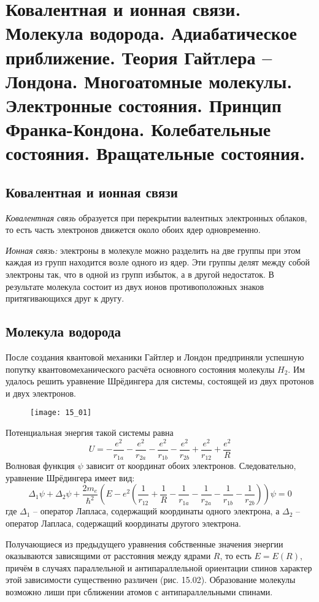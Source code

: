 \chapter{Ковалентная и ионная связи. Молекула водорода. Адиабатическое 
приближение. Теория Гайтлера -- Лондона. Многоатомные молекулы. 
Электронные состояния. Принцип Франка-Кондона. Колебательные состояния. 
Вращательные состояния.}

\section{Ковалентная и ионная связи}
\emph{Ковалентная связь} образуется при перекрытии валентных электронных 
облаков, то есть часть электронов движется около обоих ядер одновременно.

\emph{Ионная связь:} электроны в молекуле можно разделить на две группы 
при этом каждая из групп находится возле одного из ядер. Эти группы делят 
между собой электроны так, что в одной из групп избыток, а в другой 
недостаток. В результате молекула состоит из двух ионов противоположных 
знаков притягивающихся друг к другу.

\section{Молекула водорода}
После создания квантовой механики Гайтлер и Лондон предприняли успешную 
попутку квантовомеханического расчёта основного состояния молекулы 
\( H_2 \). Им удалось решить уравнение Шрёдингера для системы, состоящей 
из двух протонов и двух электронов.

\begin{figure}[h!]
    \center
    \texttt{[image: 15\_01]}
\end{figure}

Потенциальная энергия такой системы равна
\[ 
	U = -\frac{e^2}{r_{1a}} - \frac{e^2}{r_{2a}} - \frac{e^2}{r_{1b}} -
	\frac{e^2}{r_{2b}} + \frac{e^2}{r_{12}} + \frac{e^2}{R} 
\]
Волновая функция \( \psi \) зависит от координат обоих электронов. 
Следовательно, уравнение Шрёдингера имеет вид:
\[ 
	\Delta_1\psi + \Delta_2\psi + \frac{2m_e}{\hbar^2}
	\left(E - e^2\left( \frac{1}{r_{12}} + \frac{1}{R} -
	\frac{1}{r_{1a}} - \frac{1}{r_{2a}} - \frac{1}{r_{1b}} -
	\frac{1}{r_{2b}}\right) \right)\psi = 0
\]
где \( \Delta_1 \) -- оператор Лапласа, содержащий координаты 
одного электрона, а \( \Delta_2 \) -- оператор Лапласа, содержащий 
координаты другого электрона.

Получающиеся из предыдущего уравнения собственные значения 
энергии оказываются зависящими от расстояния между ядрами \( R \), 
то есть \( E = E(R) \), причём в случаях параллельной и 
антипараллельной ориентации спинов характер этой зависимости существенно 
различен (рис. 15.02). Образование молекулы возможно лиши при сближении 
атомов с антипараллельными спинами.

